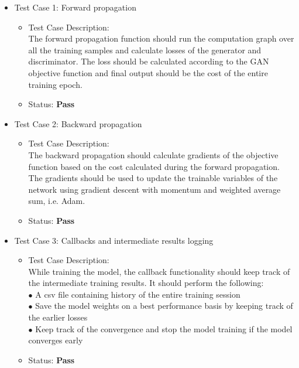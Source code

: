 \documentclass[oneside,a4paper,12pt]{report}
\begin{document}
\begin{itemize}
	\item Test Case 1: Forward propagation
	\begin{itemize}
		\item Test Case Description:\\
		The forward propagation function should run the computation graph over all the training samples and calculate losses of the generator and discriminator. The loss should be calculated according to the GAN objective function and final output should be the cost of the entire training epoch.
		\item Status: \textbf{Pass}
	\end{itemize}
	\item Test Case 2: Backward propagation
	\begin{itemize}
		\item Test Case Description:\\
		The backward propagation should calculate gradients of the objective function based on the cost calculated during the forward propagation. The gradients should be used to update the trainable variables of the network using gradient descent with momentum and weighted average sum, i.e. Adam.
		\item Status: \textbf{Pass}
	\end{itemize}
	\item Test Case 3: Callbacks and intermediate results logging
	\begin{itemize}
		\item Test Case Description:\\
		While training the model, the callback functionality should keep track of the intermediate training results. It should perform the following:\\
		$\bullet$ A csv file containing history of the entire training session\\
		$\bullet$ Save the model weights on a best performance basis by keeping track of the earlier losses\\
		$\bullet$ Keep track of the convergence and stop the model training if the model converges early
		
		\item Status: \textbf{Pass}
	\end{itemize}
\end{itemize}
\end{document}
